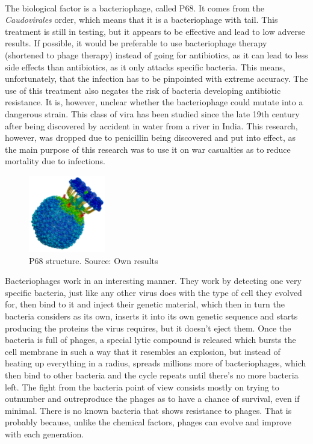 \paragraph{}The biological factor is a bacteriophage, called P68. It comes from the \emph{Caudovirales} order, which means that it is a bacteriophage with tail.  This treatment is still in testing, but it appears to be effective and lead to low adverse results. If possible, it would be preferable to use bacteriophage therapy (shortened to phage therapy) instead of going for antibiotics, as it can lead to less side effects than antibiotics, as it only attacks specific bacteria. This means, unfortunately, that the infection has to be pinpointed with extreme accuracy. The use of this treatment also negates the risk of bacteria developing antibiotic resistance. It is, however, unclear whether the bacteriophage could mutate into a dangerous strain. This class of vira has been studied since the late 19th century after being discovered by accident in water from a river in India. This research, however, was dropped due to penicillin being discovered and put into effect, as the main purpose of this research was to use it on war casualties as to reduce mortality due to infections.
\newpage{}\begin{figure}\begin{center}\includegraphics[width=0.30\textwidth]{assets/staph_side.png}\end{center}\caption{P68 structure. Source: Own results}\end{figure}Bacteriophages work in an interesting manner. They work by detecting one very specific bacteria, just like any other virus does with the type of cell they evolved for, then bind to it and inject their genetic material, which then in turn the bacteria considers as its own, inserts it into its own genetic sequence and starts producing the proteins the virus requires, but it doesn't eject them. Once the bacteria is full of phages, a special lytic compound is released which bursts the cell membrane in such a way that it resembles an explosion, but instead of heating up everything in a radius, spreads millions more of bacteriophages, which then bind to other bacteria and the cycle repeats until there's no more bacteria left. The fight from the bacteria point of view consists mostly on trying to outnumber and outreproduce the phages as to have a chance of survival, even if minimal. There is no known bacteria that shows resistance to phages. That is probably because, unlike the chemical factors, phages can evolve and improve with each generation.
